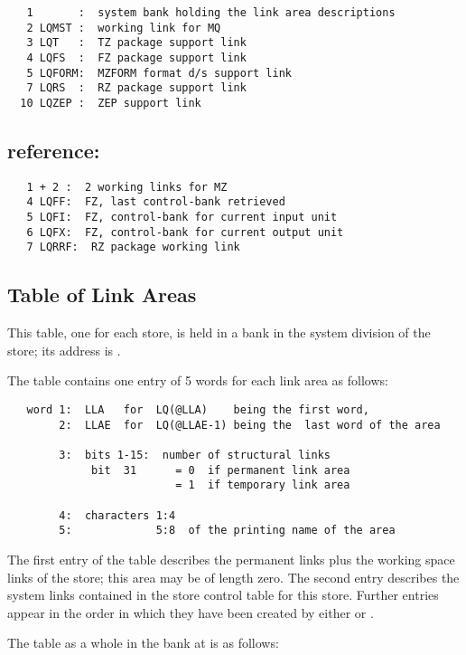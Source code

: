 \begin{verbatim}
   1       :  system bank holding the link area descriptions
   2 LQMST :  working link for MQ
   3 LQT   :  TZ package support link
   4 LQFS  :  FZ package support link
   5 LQFORM:  MZFORM format d/s support link
   7 LQRS  :  RZ package support link
  10 LQZEP :  ZEP support link
\end{verbatim} 

\subsection*{reference: }

\begin{verbatim}
   1 + 2 :  2 working links for MZ
   4 LQFF:  FZ, last control-bank retrieved
   5 LQFI:  FZ, control-bank for current input unit
   6 LQFX:  FZ, control-bank for current output unit
   7 LQRRF:  RZ package working link
\end{verbatim} 

\subsection*{Table of Link Areas}

This table, one for each store,
is held in a bank in the system division of the store;
its address is  .

The table contains one entry of 5 words for each link area
as follows:

\begin{verbatim}
   word 1:  LLA   for  LQ(@LLA)    being the first word,
        2:  LLAE  for  LQ(@LLAE-1) being the  last word of the area

        3:  bits 1-15:  number of structural links
             bit  31      = 0  if permanent link area
                          = 1  if temporary link area

        4:  characters 1:4
        5:             5:8  of the printing name of the area
\end{verbatim} 

The first entry of the table describes the permanent links
plus the working space links of the store;
this area may be of length zero.
The second entry describes the system links contained in
the store control table for this store.
Further entries appear in the order in which they have been
created by either  or .

The table as a whole in the bank at  is as follows:

